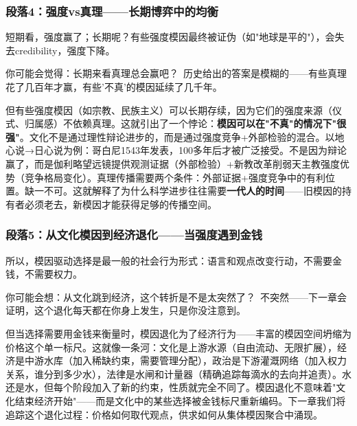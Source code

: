 \documentclass[../main.tex]{subfiles}
\begin{document}
	\subsubsection*{段落4：强度vs真理——长期博弈中的均衡}

	短期看，强度赢了；长期呢？有些强度模因最终被证伪（如"地球是平的"），会失去credibility，强度下降。

	\begin{tcolorbox}[colback=yellow!5, title=\textit{读者行为预测}]

		你可能会觉得：长期来看真理总会赢吧？\ 历史给出的答案是模糊的——有些真理花了几百年才赢，有些'不真'的模因延续了几千年。

	\end{tcolorbox}

但有些强度模因（如宗教、民族主义）可以长期存续，因为它们的强度来源（仪式、归属感）不依赖真理。这就引出了一个悖论：\textbf{模因可以在"不真"的情况下"很强"}。文化不是通过理性辩论进步的，而是通过强度竞争+外部检验的混合。以地心说→日心说为例：哥白尼1543年发表，100多年后才被广泛接受。不是因为辩论赢了，而是伽利略望远镜提供观测证据（外部检验）+新教改革削弱天主教强度优势（竞争格局变化）。真理传播需要两个条件：外部证据+强度竞争中的有利位置。缺一不可。这就解释了为什么科学进步往往需要\textbf{一代人的时间}——旧模因的持有者必须老去，新模因才能获得足够的传播空间。

	\subsubsection*{段落5：从文化模因到经济退化——当强度遇到金钱}

	所以，模因驱动选择是最一般的社会行为形式：语言和观点改变行动，不需要金钱，不需要权力。

	\begin{tcolorbox}[colback=yellow!5, title=\textit{读者行为预测}]

		你可能会想：从文化跳到经济，这个转折是不是太突然了？\ 不突然——下一章会证明，这个退化每天都在你身上发生，只是你没注意到。

	\end{tcolorbox}

但当选择需要用金钱来衡量时，模因退化为了经济行为——丰富的模因空间坍缩为价格这个单一标尺。这就像一条河：文化是上游水源（自由流动、无限扩展），经济是中游水库（加入稀缺约束，需要管理分配），政治是下游灌溉网络（加入权力关系，谁分到多少水），法律是水闸和计量器（精确追踪每滴水的去向并追责）。水还是水，但每个阶段加入了新的约束，性质就完全不同了。模因退化不意味着"文化结束经济开始"——而是文化中的某些选择被金钱标尺重新编码。下一章我们将追踪这个退化过程：价格如何取代观点，供求如何从集体模因聚合中涌现。
\end{document}
